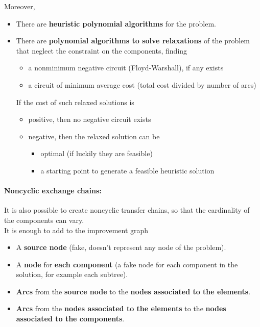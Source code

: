 \documentclass[11pt]{article}
\begin{document}
	Moreover,
	\begin{itemize}
		\item There are \textbf{heuristic polynomial algorithms} for the problem.\\
		
		\item There are \textbf{polynomial algorithms to solve relaxations} of the problem that neglect the constraint on the components, finding
		\begin{itemize}
			\item a nonminimum negative circuit (Floyd-Warshall), if any exists
			
			\item a circuit of minimum average cost (total cost divided by number of arcs)
		\end{itemize}
		If the cost of such relaxed solutions is
		\begin{itemize}
			\item positive, then no negative circuit exists
			
			\item negative, then the relaxed solution can be
			\begin{itemize}
				\item optimal (if luckily they are feasible)
				\item a starting point to generate a feasible heuristic solution
			\end{itemize}
		\end{itemize}
	\end{itemize}
	
	\newpage
	
	\paragraph{Noncyclic exchange chains:} It is also possible to create noncyclic transfer chains, so that the cardinality of the components can vary.\\
	
	It is enough to add to the improvement graph
	\begin{itemize}
		\item A \textbf{source node} (fake, doesn't represent any node of the problem).\\
		
		\item A \textbf{node} for \textbf{each component} (a fake node for each component in the solution, for example each subtree).\\
		
		\item \textbf{Arcs} from the \textbf{source node} to the \textbf{nodes associated to the elements}.\\
		
		\item \textbf{Arcs} from the \textbf{nodes associated to the elements} to the \textbf{nodes associated to the components}.\\
	\end{itemize}
	
\end{document}
